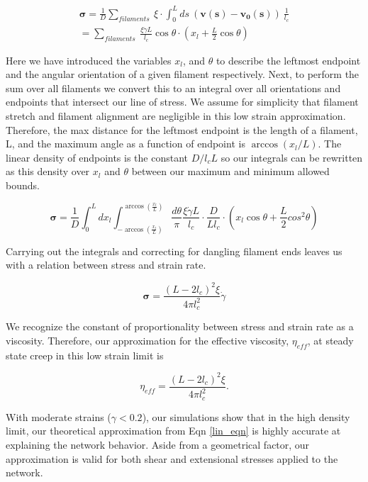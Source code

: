 \documentclass[pre,preprint]{revtex4-1}
\begin{document}
\begin{multline}
\mathbf{\sigma} =  \frac{1}{D}\sum_{filaments}\:  \xi \cdot \int_0^L ds \: (\mathbf{v(s)}-\mathbf{v_0(s)}) \:\frac{1}{l_c} \\
 = \sum_{filaments}\:  \frac{\xi \dot \gamma L}{l_c} \cos \theta \cdot (x_l + \frac{L}{2} \cos \theta)
\end{multline}

Here we have introduced the variables $x_l$, and $\theta$ to describe the leftmost endpoint and the angular orientation of a given filament respectively.  Next, to perform the sum over all filaments we convert this to an integral over all orientations and endpoints that intersect our line of stress. We assume for simplicity that filament stretch and filament alignment are negligible in this low strain approximation.  Therefore, the max distance for the leftmost endpoint is the length of a filament, L, and the maximum angle as a function of endpoint is $\arccos(x_l/L)$.  The linear density of endpoints is the constant $D/l_cL$ so our integrals can be rewritten as this density over $x_l$ and $\theta$ between our maximum and minimum allowed bounds.

\begin{equation}
\mathbf{\sigma} =  \frac{1}{D} \int_0^L dx_l \int_{-\arccos (\frac{x_l}{L})}^{\arccos (\frac{x_l}{L})}\frac{d\theta}{\pi} \frac{\xi \dot \gamma L}{l_c} \cdot \frac{D}{Ll_c}\cdot (x_l \cos \theta + \frac{L}{2} cos^2\theta)
\end{equation}

Carrying out the integrals and correcting for dangling filament ends leaves us with a relation between stress and strain rate.

\begin{equation}
\mathbf{\sigma} = \frac{(L-2l_c)^2 \xi}{4\pi l_c^2} \dot \gamma 
\end{equation}

We recognize the constant of proportionality between stress and strain rate as a viscosity.  Therefore, our approximation for the effective viscosity, $\eta_{eff}$, at steady state creep in this low strain limit is

\begin{equation}
\label{lin_eqn}
\eta_{eff} = \frac{(L-2l_c)^2 \xi}{4\pi l_c^2} .
\end{equation}

With moderate strains ($\gamma<0.2$), our  simulations show that in the high density limit, our theoretical approximation from Eqn \ref{lin_eqn} is highly accurate at explaining the network behavior.  Aside from a geometrical factor, our approximation is valid for both shear and extensional stresses applied to the network.
\end{document}
